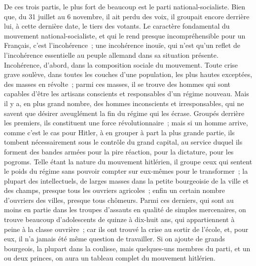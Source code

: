 \documentclass[french,twoside]{book} %
\begin{document}
\noindent De ces trois partis, le plus fort de beaucoup est le parti national-socialiste. Bien que, du 31 juillet au 6 novembre, il ait perdu des voix, il groupait encore derrière lui, à cette dernière date, le tiers des votants. Le caractère fondamen­tal du mouvement national-socialiste, et qui le rend presque incompréhensible pour un Français, c'est l'incohérence ; une incohérence inouïe, qui n'est qu'un reflet de l'incohérence essentielle au peuple allemand dans sa situation présente. Incohérence, d'abord, dans la composition sociale du mouvement. Toute crise grave soulève, dans toutes les couches d'une population, les plus hautes exceptées, des masses en révolte ; parmi ces masses, il se trouve des hommes qui sont capables d'être les artisans conscients et responsables d'un régime nouveau. Mais il y a, en plus grand nombre, des hommes inconscients et irresponsables, qui ne savent que désirer aveuglément la fin du régime qui les écrase. Groupés derrière les premiers, ils constituent une force révolution­naire ; mais si un homme arrive, comme c'est le cas pour Hitler, à en grouper à part la plus grande partie, ils tombent nécessairement sous le contrôle du grand capital, au service duquel ils forment des bandes armées pour la pire réaction, pour la dictature, pour les pogroms. Telle étant la nature du mouvement hitlérien, il groupe ceux qui sentent le poids du régime sans pou­voir compter sur eux-mêmes pour le transformer ; la plupart des intellectuels, de larges masses dans la petite bourgeoisie de la ville et des champs, presque tous les ouvriers agricoles ; enfin un certain nombre d'ouvriers des villes, presque tous chômeurs. Parmi ces derniers, qui sont au moins en partie dans les troupes d'assauts en qualité de simples mercenaires, on trouve beaucoup d'adolescents de quinze à dix-huit ans, qui appartiennent à peine à la classe ouvrière ; car ils ont trouvé la crise au sortir de l'école, et, pour eux, il n'a jamais été même question de travailler. Si on ajoute de grands bourgeois, la plupart dans la coulisse, mais quelques-uns membres du parti, et un ou deux princes, on aura un tableau complet du mouvement hitlérien.\par
\end{document}
